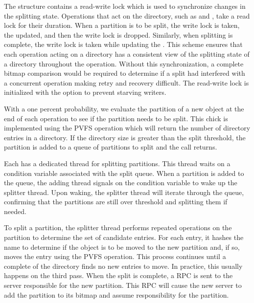 \documentclass[onecolumn, 11pt, letterpaper]{article}
\begin{document}
The  structure contains a read-write lock which is used
to synchronize changes in the splitting state.  Operations that act on the
directory, such as  and , take a read lock for their
duration.  When a partition is to be split, the write lock is taken, the
 updated, and then the write lock is dropped.
Similarly, when splitting is complete, the write lock is taken while updating
the .  This scheme ensures that each operation acting
on a directory has a consistent view of the splitting state of a directory
throughout the operation.  Without this synchronization, a complete bitmap
comparison would be required to determine if a split had interfered with a
concurrent operation making retry and recovery difficult.  The read-write lock
is initialized with the
 option to prevent
starving writers.

With a one percent probability, we evaluate the partition of a new object at
the end of each  operation to see if the partition needs to be
split.  This chick is implemented using the PVFS  operation
which will return the number of directory entries in a directory.  If the
directory size is greater than the split threshold, the partition is added to
a queue of partitions to split and the  call returns.

Each  has a dedicated thread for splitting partitions.
This thread waits on a condition variable associated with the split queue.
When a partition is added to the queue, the adding thread signals on the
condition variable to wake up the splitter thread.  Upon waking, the splitter
thread will iterate through the queue, confirming that the partitions are
still over threshold and splitting them if needed.

To split a partition, the splitter thread performs repeated 
operations on the partition to determine the set of candidate entries.  For
each entry, it hashes the name to determine if the object is to be moved to
the new partition and, if so, moves the entry using the PVFS 
operation.  This process continues until a complete  of the
directory finds no new entries to move.  In practice, this usually happens on
the third pass.  When the split is complete, a  RPC is
sent to the server responsible for the new partition.  This RPC will cause the
new server to add the partition to its bitmap and assume responsibility for
the partition.
\end{document}

